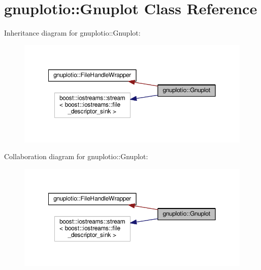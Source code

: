 \hypertarget{classgnuplotio_1_1_gnuplot}{}\section{gnuplotio\+:\+:Gnuplot Class Reference}
\label{classgnuplotio_1_1_gnuplot}


Inheritance diagram for gnuplotio\+:\+:Gnuplot\+:\nopagebreak
\begin{figure}[H]
\begin{center}
\leavevmode
\includegraphics[width=350pt]{classgnuplotio_1_1_gnuplot__inherit__graph}
\end{center}
\end{figure}


Collaboration diagram for gnuplotio\+:\+:Gnuplot\+:\nopagebreak
\begin{figure}[H]
\begin{center}
\leavevmode
\includegraphics[width=350pt]{classgnuplotio_1_1_gnuplot__coll__graph}
\end{center}
\end{figure}
